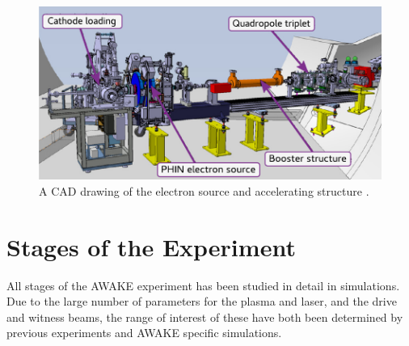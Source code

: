 \begin{figure}[hbt]
    \centering
    \includegraphics[width=0.70\linewidth,trim={0mm 0mm 0mm 0mm},clip]{figures/ElectronSource}
    \caption{\label{Fig:WFA:ESource}
        A CAD drawing of the electron source and accelerating structure \cite{pepitone:2016}.
    }
\end{figure}

\section{Stages of the Experiment}
\label{WFA:AWAKE}

All stages of the AWAKE experiment has been studied in detail in simulations.
Due to the large number of parameters for the plasma and laser, and the drive and witness beams, the range of interest of these have both been determined by previous experiments and AWAKE specific simulations.

